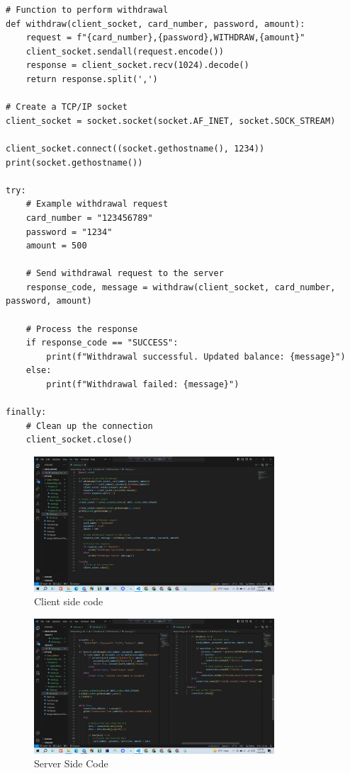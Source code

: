 \documentclass[11pt]{article}
\begin{document}
\begin{itemize}
\begin{verbatim}
# Function to perform withdrawal
def withdraw(client_socket, card_number, password, amount):
    request = f"{card_number},{password},WITHDRAW,{amount}"
    client_socket.sendall(request.encode())
    response = client_socket.recv(1024).decode()
    return response.split(',')

# Create a TCP/IP socket
client_socket = socket.socket(socket.AF_INET, socket.SOCK_STREAM)

client_socket.connect((socket.gethostname(), 1234))
print(socket.gethostname())

try:
    # Example withdrawal request
    card_number = "123456789"
    password = "1234"
    amount = 500

    # Send withdrawal request to the server
    response_code, message = withdraw(client_socket, card_number, password, amount)

    # Process the response
    if response_code == "SUCCESS":
        print(f"Withdrawal successful. Updated balance: {message}")
    else:
        print(f"Withdrawal failed: {message}")

finally:
    # Clean up the connection
    client_socket.close()
\end{verbatim}
  
   
    \begin{figure}[H]
        \centering
        \includegraphics[width=0.8\textwidth]{atm.client.png}
        \caption{Client side code}
        \label{fig:1}
    \end{figure}
    
    \begin{figure}[H]
        \centering
        \includegraphics[width=0.8\textwidth]{atm.server.png}
        \caption{Server Side Code}
        \label{fig:2}
    \end{figure}
    

\end{itemize}
\end{document}
